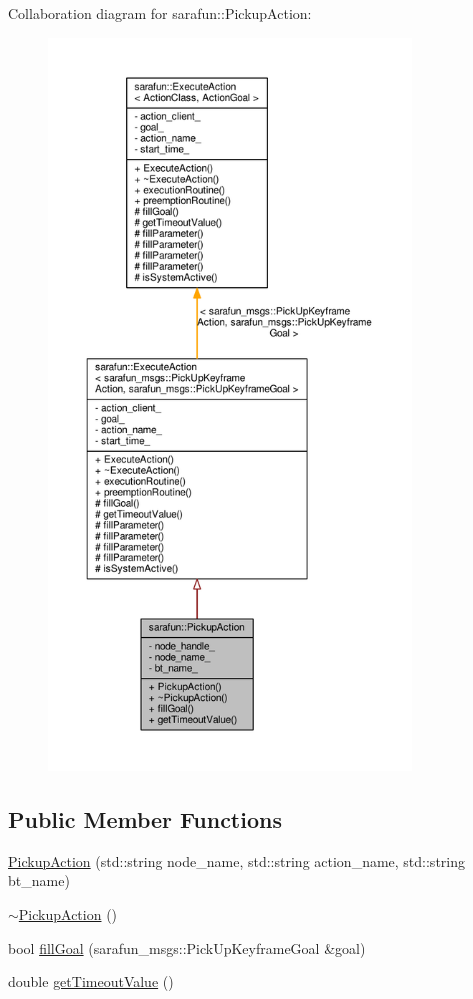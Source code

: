 Collaboration diagram for sarafun\-:\-:Pickup\-Action\-:\nopagebreak
\begin{figure}[H]
\begin{center}
\leavevmode
\includegraphics[height=550pt]{d5/da2/classsarafun_1_1PickupAction__coll__graph}
\end{center}
\end{figure}
\subsection*{Public Member Functions}
\begin{DoxyCompactItemize}
\item 
\hyperlink{classsarafun_1_1PickupAction_a1663ebd551413acbc5f21e86a0e3b8cc_a1663ebd551413acbc5f21e86a0e3b8cc}{Pickup\-Action} (std\-::string node\-\_\-name, std\-::string action\-\_\-name, std\-::string bt\-\_\-name)
\item 
\hyperlink{classsarafun_1_1PickupAction_acadfc84a0339caa9cc02c5d599e6aaeb_acadfc84a0339caa9cc02c5d599e6aaeb}{$\sim$\-Pickup\-Action} ()
\item 
bool \hyperlink{classsarafun_1_1PickupAction_a4aa9956733de9f12b52aa41038dbe87a_a4aa9956733de9f12b52aa41038dbe87a}{fill\-Goal} (sarafun\-\_\-msgs\-::\-Pick\-Up\-Keyframe\-Goal \&goal)
\item 
double \hyperlink{classsarafun_1_1PickupAction_a02643cdc836095102e5622b660233f26_a02643cdc836095102e5622b660233f26}{get\-Timeout\-Value} ()
\end{DoxyCompactItemize}
